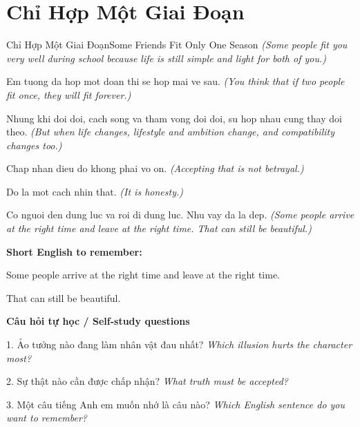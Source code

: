 \section{Chỉ Hợp Một Giai Đoạn}
\begin{truyen}{Chỉ Hợp Một Giai Đoạn}{Some Friends Fit Only One Season}
\textit{(Some people fit you very well during school because life is still simple and light for both of you.)}

Em tuong da hop mot doan thi se hop mai ve sau.
\textit{(You think that if two people fit once, they will fit forever.)}

Nhung khi doi doi, cach song va tham vong doi doi, su hop nhau cung thay doi theo.
\textit{(But when life changes, lifestyle and ambition change, and compatibility changes too.)}

Chap nhan dieu do khong phai vo on.
\textit{(Accepting that is not betrayal.)}

Do la mot cach nhin that.
\textit{(It is honesty.)}

\end{truyen}

\begin{baihoc}
Co nguoi den dung luc va roi di dung luc. Nhu vay da la dep.
\textit{(Some people arrive at the right time and leave at the right time. That can still be beautiful.)}
\end{baihoc}

\begin{ghinhoanh}
\textbf{Short English to remember:}

Some people arrive at the right time and leave at the right time.

That can still be beautiful.

\end{ghinhoanh}

\begin{tuhocnhanh}
\textbf{Câu hỏi tự học / Self-study questions}

1. Ảo tưởng nào đang làm nhân vật đau nhất? \textit{Which illusion hurts the character most?}

2. Sự thật nào cần được chấp nhận? \textit{What truth must be accepted?}

3. Một câu tiếng Anh em muốn nhớ là câu nào? \textit{Which English sentence do you want to remember?}
\end{tuhocnhanh}
\ngancach

